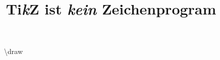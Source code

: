 \documentclass[a4paper, 12pt]{article}
\title{Ti\emph{k}Z ist \emph{kein} Zeichenprogram}
\begin{document}
\begin{figure}

  \center



  \caption{\textbackslash draw}

\end{figure}
\end{document}
